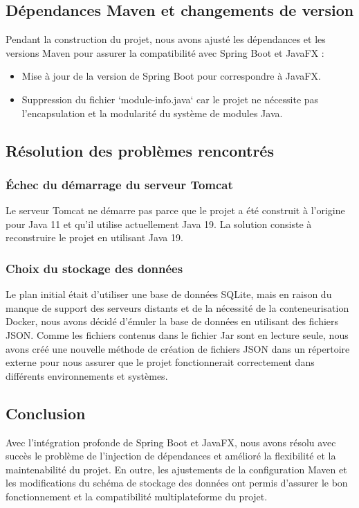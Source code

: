 \documentclass{article}
\begin{document}
\subsection{Dépendances Maven et changements de version}
Pendant la construction du projet, nous avons ajusté les dépendances et les versions Maven pour assurer la compatibilité avec Spring Boot et JavaFX :
\begin{itemize}
  \item  Mise à jour de la version de Spring Boot pour correspondre à JavaFX.
  \item Suppression du fichier `module-info.java` car le projet ne nécessite pas l'encapsulation et la modularité du système de modules Java.
\end{itemize}
\subsection{Résolution des problèmes rencontrés}
\subsubsection{Échec du démarrage du serveur Tomcat}
Le serveur Tomcat ne démarre pas parce que le projet a été construit à l'origine pour Java 11 et qu'il utilise actuellement Java 19. La solution consiste à reconstruire le projet en utilisant Java 19.
\subsubsection{Choix du stockage des données}
Le plan initial était d'utiliser une base de données SQLite, mais en raison du manque de support des serveurs distants et de la nécessité de la conteneurisation Docker, nous avons décidé d'émuler la base de données en utilisant des fichiers JSON. Comme les fichiers contenus dans le fichier Jar sont en lecture seule, nous avons créé une nouvelle méthode de création de fichiers JSON dans un répertoire externe pour nous assurer que le projet fonctionnerait correctement dans différents environnements et systèmes.
\subsection{Conclusion}
Avec l'intégration profonde de Spring Boot et JavaFX, nous avons résolu avec succès le problème de l'injection de dépendances et amélioré la flexibilité et la maintenabilité du projet. En outre, les ajustements de la configuration Maven et les modifications du schéma de stockage des données ont permis d'assurer le bon fonctionnement et la compatibilité multiplateforme du projet.
\end{document}
